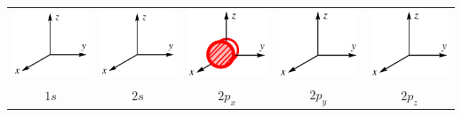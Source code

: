\begin{center}
{\begin{tabular}{ccccc}
\includegraphics[scale=0.6]{figure/repere_orbitale.eps} & \includegraphics[scale=0.6]{figure/repere_orbitale.eps} & \includegraphics[scale=0.6]{figure/orbitale.eps} & \includegraphics[scale=0.6]{figure/repere_orbitale.eps} & \includegraphics[scale=0.6]{figure/repere_orbitale.eps} \\
$1s$ & $2s$ & $2p_x$ & $2p_y$ & $2p_z$
\end{tabular}
}
\end{center}
